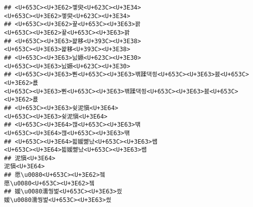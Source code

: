 \documentclass[]{article}
\begin{document}
\begin{verbatim}
## <U+653C><U+3E62>꼫臾<U+623C><U+3E34>                                                                                                                                                                             <U+653C><U+3E62>꼫臾<U+623C><U+3E34>
## <U+653C><U+3E62>끂<U+653C><U+3E63>꽑                                                                                                                                                                             <U+653C><U+3E62>끂<U+653C><U+3E63>꽑
## <U+653C><U+3E63>꽕移<U+393C><U+3E38>                                                                                                                                                                             <U+653C><U+3E63>꽕移<U+393C><U+3E38>
## <U+653C><U+3E63>닔嫄<U+623C><U+3E30>                                                                                                                                                                             <U+653C><U+3E63>닔嫄<U+623C><U+3E30>
## <U+653C><U+3E63>뿬<U+653C><U+3E63>꽦蹂댁쑁<U+653C><U+3E63>븘<U+653C><U+3E62>룞                                                                                                                 <U+653C><U+3E63>뿬<U+653C><U+3E63>꽦蹂댁쑁<U+653C><U+3E63>븘<U+653C><U+3E62>룞
## <U+653C><U+3E63>슂泥愼<U+3E64>                                                                                                                                                                                   <U+653C><U+3E63>슂泥愼<U+3E64>
## <U+653C><U+3E64>깮<U+653C><U+3E63>떆                                                                                                                                                                             <U+653C><U+3E64>깮<U+653C><U+3E63>떆
## <U+653C><U+3E64>븳媛뺢났<U+653C><U+3E63>썝                                                                                                                                                                 <U+653C><U+3E64>븳媛뺢났<U+653C><U+3E63>썝
## 泥愼<U+3E64>                                                                                                                                                                                                           泥愼<U+3E64>
## 愿\u0080<U+653C><U+3E62>젴                                                                                                                                                                                     愿\u0080<U+653C><U+3E62>젴
## 媛\u0080濡쒕벑<U+653C><U+3E63>씠                                                                                                                                                                         媛\u0080濡쒕벑<U+653C><U+3E63>씠

\end{verbatim}
\end{document}
